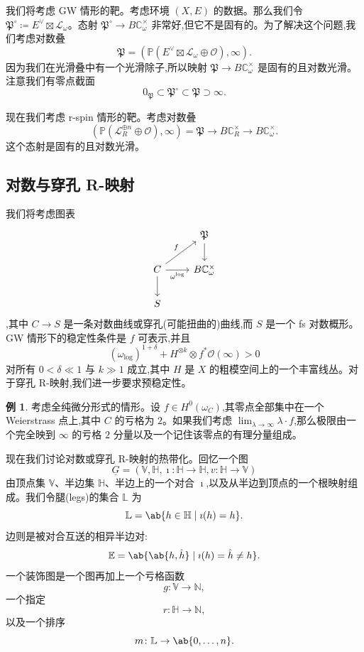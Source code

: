 \documentclass{amsart}
\theoremstyle{definition}
\newtheorem{exm}[thm]{例}
\theoremstyle{remark}
\theoremstyle{plain}
\theoremstyle{definition}
\theoremstyle{remark}
\newcommand{\N}{\mathbb{N}}
\newcommand{\C}{\mathbb{C}}
\newcommand{\E}{\mathbb{E}}
\newcommand{\V}{\mathbb{V}}
\renewcommand{\H}{\mathbb{H}}
\renewcommand{\L}{\mathbb{L}}
\renewcommand{\P}{\mathbb{P}}
\newcommand{\mc}[1]{\mathcal{#1}}
\newcommand{\mf}[1]{\mathfrak{#1}}
\newcommand{\ul}[1]{\underline{#1}}
\newcommand{\1}{\mathbf{1}}
\newcommand{\2}{\mathbf{2}}
\newcommand{\3}{\mathbf{3}}
\begin{document}
我们将考虑 GW 情形的靶。考虑环境 \((X, E)\) 的数据。那么我们令 \(\mf{P}^{\circ} \coloneqq E^{\vee} \boxtimes \mc{L}_{\omega}\)。态射 \(\mf{P}^{\circ} \to B \C_{\omega}^{\times}\) 非常好,但它不是固有的。为了解决这个问题,我们考虑对数叠
\[ \mf{P} = ( \P(E^{\vee} \boxtimes \mc{L}_{\omega} \oplus \mc{O}) , \infty). \]
因为我们在光滑叠中有一个光滑除子,所以映射 \(\mf{P} \to B \C_{\omega}^{\times}\) 是固有的且对数光滑。注意我们有零点截面
\[ 0_{\mf{P}} \subset \mf{P}^{\circ} \subset \mf{P} \supset \infty. \]

现在我们考虑 r-spin 情形的靶。考虑对数叠
\[ (\P(\mc{L}_R^{\oplus n} \oplus \mc{O}), \infty) = \mf{P} \to B \C_R^{\times} \to B \C_{\omega}^{\times}. \]
这个态射是固有的且对数光滑。

\subsection{对数与穿孔 R-映射}%
\label{sub:Log and punctured R-maps}

我们将考虑图表
\begin{equation*}
\begin{tikzcd}
    & \mf{P} \ar{d} \\
    C \ar{ur}{f} \ar{r}[swap]{\omega^{\log}} \ar{d} & B \C_{\omega}^{\times} \\
    S
\end{tikzcd}
\end{equation*}
,其中 \(C \to S\) 是一条对数曲线或穿孔(可能扭曲的)曲线,而 \(S\) 是一个 fs 对数概形。GW 情形下的稳定性条件是 \(f\) 可表示,并且
\[ (\omega_{\log})^{1+\delta} + H^{\otimes k} \otimes f^* \mc{O}(\infty) > 0 \]
对所有 \(0 < \delta \ll 1\) 与 \(k \gg 1\) 成立,其中 \(H\) 是 \(X\) 的粗模空间上的一个丰富线丛。对于穿孔 R-映射,我们进一步要求预稳定性。

\begin{exm}
    考虑全纯微分形式的情形。设 \(f \in H^0(\omega_C)\),其零点全部集中在一个 Weierstrass 点上,其中 \(C\) 的亏格为 \(2\)。如果我们考虑 \(\lim_{\lambda \to \infty} \lambda \cdot f\),那么极限由一个完全映到 \(\infty\) 的亏格 \(2\) 分量以及一个记住该零点的有理分量组成。
\end{exm}

现在我们讨论对数或穿孔 R-映射的热带化。回忆一个图
\[ \ul{G} = (\V, \H, \imath \colon \H \to \H, v \colon \H \to \V) \]
由顶点集 \(\V\)、半边集 \(\H\)、半边上的一个对合 \(\imath\),以及从半边到顶点的一个根映射组成。我们令腿(legs)的集合 \(\L\) 为
\[ \L = \ab\{ h \in \H \mid \imath(h) = h\}. \]
边则是被对合互送的相异半边对:
\[ \E = \ab\{ \ab\{h, \hat{h}\} \mid \imath(h) = \hat{h} \neq h \}. \]
一个装饰图是一个图再加上一个亏格函数
\[ g \colon \V \to \N, \]
一个指定
\[ r \colon \H \to \N, \]
以及一个排序
\[ m \colon \L \to \ab\{0, \ldots, n\}. \]
\end{document}
